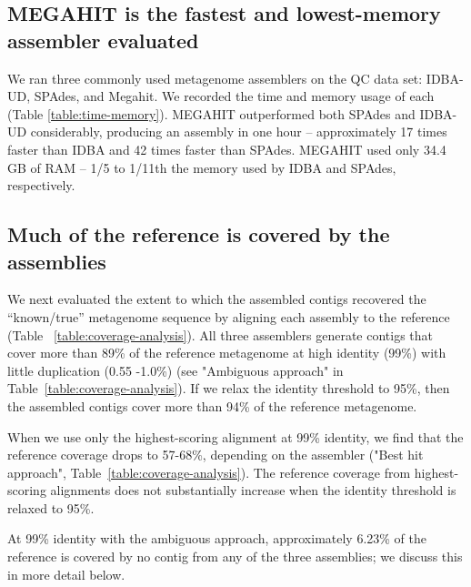 \documentclass[10pt,a4paper,twocolumn]{article}
\begin{document}
\subsection*{MEGAHIT is the fastest and lowest-memory assembler evaluated}

We ran three commonly used metagenome assemblers on the QC data set:
IDBA-UD, SPAdes, and Megahit. We recorded the time and memory usage of
each (Table \ref{table:time-memory}).  MEGAHIT outperformed both
SPAdes and IDBA-UD considerably, producing an assembly in one hour --
approximately 17 times faster than IDBA and 42 times faster than
SPAdes.  MEGAHIT used only 34.4 GB of RAM -- 1/5 to 1/11th
the memory used by IDBA and SPAdes, respectively.

\subsection*{Much of the reference is covered by the assemblies}

We next evaluated the extent to which the assembled contigs recovered the
``known/true'' metagenome sequence by aligning each assembly to the
reference (Table ~\ref{table:coverage-analysis}).  All three
assemblers generate contigs that cover more than 89\% of the reference
metagenome at high identity (99\%) with little duplication
(0.55 -1.0\%) (see "Ambiguous approach" in
Table~\ref{table:coverage-analysis}).  If we relax the identity
threshold to 95\%, then the assembled contigs cover more than 94\% of
the reference metagenome.


When we use only the highest-scoring alignment at 99\% identity, we
find that the reference coverage drops to 57-68\%, depending on the
assembler ("Best hit approach",
Table~\ref{table:coverage-analysis}). The reference coverage from
highest-scoring alignments does not substantially increase when the
identity threshold is relaxed to 95\%.

At 99\% identity with the ambiguous approach, approximately 6.23\% of
the reference is covered by no contig from any of the three
assemblies; we discuss this in more detail below.
\end{document}
